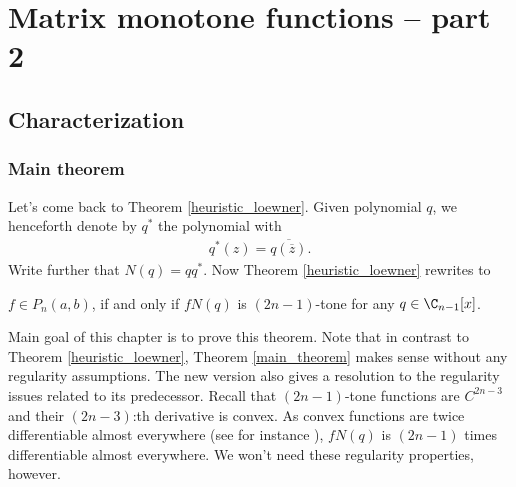 \chapter{Matrix monotone functions -- part 2}

\section{Characterization}

\subsection{Main theorem}

Let's come back to Theorem \ref{heuristic_loewner}. Given polynomial $q$, we henceforth denote by $q^{*}$ the polynomial with
\begin{align*}
	q^{*}(z) = \overline{q(\overline{z})}.
\end{align*}
Write further that $N(q) = q q^{*}$. Now Theorem  \ref{heuristic_loewner} rewrites to

\begin{lause}\label{main_theorem}
	$f \in P_{n}(a, b)$, if and only if $f N(q)$ is $(2 n - 1)$-tone for any $q \in \C_{n - 1}[x]$.
\end{lause}

Main goal of this chapter is to prove this theorem. Note that in contrast to Theorem \ref{heuristic_loewner}, Theorem \ref{main_theorem} makes sense without any regularity assumptions. The new version also gives a resolution to the regularity issues related to its predecessor. Recall that $(2 n - 1)$-tone functions are $C^{2 n - 3}$ and their $(2 n - 3)$:th derivative is convex. As convex functions are twice differentiable almost everywhere (see for instance \cite{Aleks}), $f N(q)$ is $(2 n - 1)$ times differentiable almost everywhere. We won't need these regularity properties, however.

